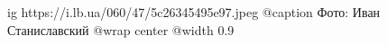  
 
 
 
 

\ifcmt
  ig https://i.lb.ua/060/47/5c26345495e97.jpeg
	@caption Фото: Иван Станиславский
  @wrap center
  @width 0.9
\fi
